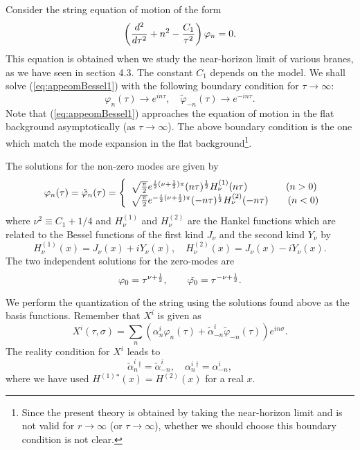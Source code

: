 \documentclass[a4paper,12pt]{article}
\begin{document}
Consider the string equation of motion of the form
\begin{equation}
\left({d^2\over d\tau^2}+n^2
- {C_{1}\over \tau^{2}} \right)\varphi_{n}=0.
\label{eq:appeomBessel1}
\end{equation}
This equation is obtained when we study the near-horizon 
limit of various branes, as we have seen in section 4.3. 
The constant $C_{1}$ depends on the model. 
We shall solve (\ref{eq:appeomBessel1})
with the following boundary condition for 
$\tau\rightarrow\infty$:
\begin{equation}
\varphi_{n}(\tau)\rightarrow e^{in\tau},\quad
\tilde{\varphi}_{-n}(\tau)\rightarrow e^{-in\tau}.
\label{eq:assbc}
\end{equation}
Note that (\ref{eq:appeomBessel1}) approaches the equation
of motion in the flat background asymptotically
(as $\tau\rightarrow\infty$).
The above boundary condition is the one which 
match the mode expansion in the flat background\footnote{Since 
the present theory is obtained
by taking the near-horizon limit and is not valid for 
$r\rightarrow\infty$ (or $\tau\rightarrow\infty$),
whether we should choose this boundary condition is not clear.}.

The solutions for the non-zero modes are given by 
\begin{eqnarray}
&&\varphi_{n}(\tau)=\tilde{\varphi}_{n}(\tau)=\left\{
\begin{array}{l}
\sqrt{{\pi\over 2}}e^{{i\over 2}(\nu +{1\over 2})\pi}
(n\tau)^{{1\over 2}}H^{(1)}_{\nu}(n\tau)\qquad\qquad (n>0)\\
\sqrt{{\pi\over 2}}e^{-{i\over 2}(\nu +{1\over 2})\pi}
(-n\tau)^{{1\over 2}}H^{(2)}_{\nu}(-n\tau)\qquad (n<0)\\
\end{array}\right.
\end{eqnarray}
where $\nu^2\equiv C_{1}+1/4$ and 
$H^{(1)}_{\nu}$ and $H^{(2)}_{\nu}$ are the Hankel functions
which are related to the Bessel functions of the first kind
$J_{\nu}$ and the second kind $Y_{\nu}$ by
\[
H^{(1)}_{\nu}(x)=J_{\nu}(x)+iY_{\nu}(x),\quad
H^{(2)}_{\nu}(x)=J_{\nu}(x)-iY_{\nu}(x).
\]
The two independent solutions for the zero-modes
are 
\begin{equation}
\varphi_0=\tau^{\nu +{1\over 2}},\qquad
\tilde{\varphi_0}=\tau^{-\nu +{1\over 2}}.
\end{equation}

We perform the quantization of the string using 
the solutions found above as the basis functions.
Remember that $X^{i}$ is given as
\[
X^{i}(\tau,\sigma)=\sum_{n}\left(\alpha_{n}^{i}
\varphi_{n}(\tau)+ \tilde{\alpha}_{-n}^{i}
\tilde{\varphi}_{-n}(\tau) \right)
e^{in\sigma}.
\]
The reality condition for $X^i$ leads to
\begin{equation}
\tilde{\alpha}^{i}_{n}{}^{\dagger}=\tilde{\alpha}^{i}_{-n},\quad
\alpha^{i}_{n}{}^{\dagger}=\alpha^{i}_{-n},
\end{equation}
where we have used
$H^{(1)}{}^*(x) =H^{(2)}(x)$ for a real $x$.
\end{document}
